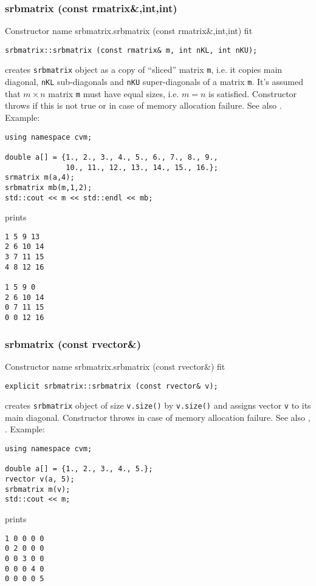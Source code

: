 \subsubsection{srbmatrix (const rmatrix\&,int,int)}
Constructor%
\pdfdest name {srbmatrix.srbmatrix (const rmatrix&,int,int)} fit
\begin{verbatim}
srbmatrix::srbmatrix (const rmatrix& m, int nKL, int nKU);
\end{verbatim}
creates  \verb"srbmatrix" object as a copy of ``sliced'' 
matrix \verb"m", i.e. it copies main diagonal, \verb"nKL" 
sub-diagonals and \verb"nKU" super-diagonals of a matrix \verb"m".
It's assumed that $m\times n$ matrix \verb"m" must have equal
sizes, i.e. $m = n$ is satisfied.
Constructor throws  
if this is not true or in case of memory allocation failure.
See also .
Example:
\begin{Verbatim}
using namespace cvm;

double a[] = {1., 2., 3., 4., 5., 6., 7., 8., 9.,
              10., 11., 12., 13., 14., 15., 16.};
srmatrix m(a,4);
srbmatrix mb(m,1,2);
std::cout << m << std::endl << mb;
\end{Verbatim}
prints
\begin{Verbatim}
1 5 9 13
2 6 10 14
3 7 11 15
4 8 12 16

1 5 9 0
2 6 10 14
0 7 11 15
0 0 12 16
\end{Verbatim}
\newpage



\subsubsection{srbmatrix (const rvector\&)}
Constructor%
\pdfdest name {srbmatrix.srbmatrix (const rvector&)} fit
\begin{verbatim}
explicit srbmatrix::srbmatrix (const rvector& v);
\end{verbatim}
creates \verb"srbmatrix" object
of size \verb"v.size()" by \verb"v.size()"
and assigns vector \verb"v" to its main diagonal.
Constructor throws  
in case of memory allocation failure.
See also , .
Example:
\begin{Verbatim}
using namespace cvm;

double a[] = {1., 2., 3., 4., 5.};
rvector v(a, 5);
srbmatrix m(v);
std::cout << m;
\end{Verbatim}
prints
\begin{Verbatim}
1 0 0 0 0
0 2 0 0 0
0 0 3 0 0
0 0 0 4 0
0 0 0 0 5
\end{Verbatim}
\newpage




